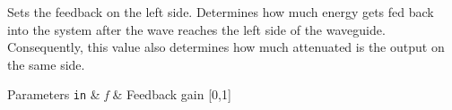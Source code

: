 Sets the feedback on the left side. Determines how much energy gets fed back into the system after the wave reaches the left side of the waveguide. Consequently, this value also determines how much attenuated is the output on the same side. 


\begin{DoxyParams}[1]{Parameters}
\mbox{\tt in}  & {\em f} & Feedback gain \mbox{[}0,1\mbox{]} \\
\hline
\end{DoxyParams}
